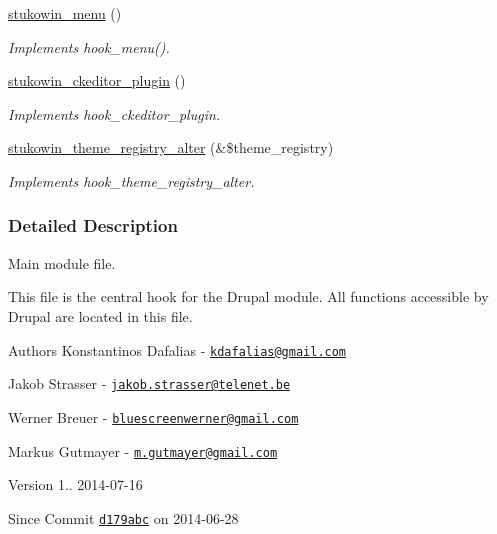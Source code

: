 \begin{DoxyCompactItemize}
\hyperlink{group___stukowin___module_ga59cfbad113b7aa2d10f0b204a5f7ba0d}{stukowin\+\_\+menu} ()
\begin{DoxyCompactList}\small\item\em Implements hook\+\_\+menu(). \end{DoxyCompactList}\item 
\hyperlink{group___drupal2_a_g_g_gae3c906d1ab9c3d8ed245d58c1ebf2a4a}{stukowin\+\_\+ckeditor\+\_\+plugin} ()
\begin{DoxyCompactList}\small\item\em Implements hook\+\_\+ckeditor\+\_\+plugin. \end{DoxyCompactList}\item 
\hyperlink{group___drupal2_a_g_g_ga3bf2203298453c41bf9a5ec48d3c2de3}{stukowin\+\_\+theme\+\_\+registry\+\_\+alter} (\&\$theme\+\_\+registry)
\begin{DoxyCompactList}\small\item\em Implements hook\+\_\+theme\+\_\+registry\+\_\+alter. \end{DoxyCompactList}\end{DoxyCompactItemize}


\subsubsection{Detailed Description}
Main module file. 

This file is the central hook for the Drupal module. All functions accessible by Drupal are located in this file.

\begin{DoxyAuthor}{Authors}
Konstantinos Dafalias -\/ \href{mailto:kdafalias@gmail.com}{\tt kdafalias@gmail.\+com} 

Jakob Strasser -\/ \href{mailto:jakob.strasser@telenet.be}{\tt jakob.\+strasser@telenet.\+be} 

Werner Breuer -\/ \href{mailto:bluescreenwerner@gmail.com}{\tt bluescreenwerner@gmail.\+com} 

Markus Gutmayer -\/ \href{mailto:m.gutmayer@gmail.com}{\tt m.\+gutmayer@gmail.\+com} 
\end{DoxyAuthor}
\begin{DoxyVersion}{Version}
1.. 2014-\/07-\/16 
\end{DoxyVersion}
\begin{DoxySince}{Since}
Commit \href{http://github.com/TheJake123/DrupalModul/commit/d179abcc5e05743086cd67cf1ce30b08923a7183}{\tt d179abc} on 2014-\/06-\/28 
\end{DoxySince}


